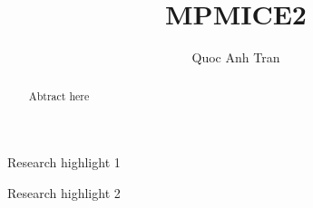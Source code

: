 \documentclass[preprint,12pt]{elsarticle}
\begin{document}

%
\setcounter{equation}{0}
\setcounter{figure}{0}
\setcounter{section}{0}
%
 

\begin{frontmatter}



\title{MPMICE2}


\author{Quoc Anh Tran}


\begin{abstract}
Abtract here
\end{abstract}

\begin{graphicalabstract}
\end{graphicalabstract}

\begin{highlights}
\item Research highlight 1
\item Research highlight 2
\end{highlights}

\begin{keyword}



\end{keyword}

\end{frontmatter}
\end{document}
